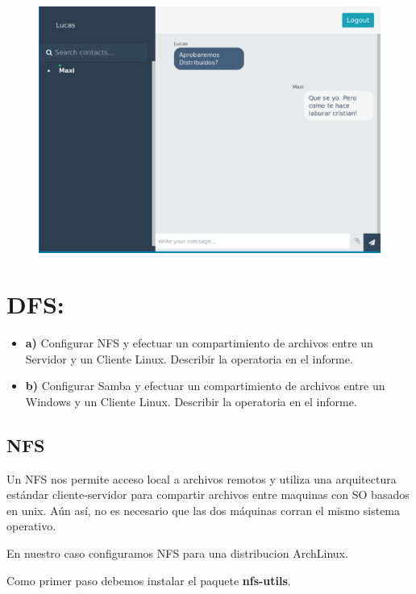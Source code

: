 \documentclass[12pt]{extarticle}
\begin{document}
\begin{figure}[h]
\centering
\includegraphics{images/chat-chat.png}
\end{figure}


    \section{DFS:}\label{dfs}

\begin{itemize}
\item
  \textbf{a)} Configurar NFS y efectuar un compartimiento de archivos
  entre un Servidor y un Cliente Linux. Describir la operatoria en el
  informe.
\item
  \textbf{b)} Configurar Samba y efectuar un compartimiento de archivos
  entre un Windows y un Cliente Linux. Describir la operatoria en el
  informe.
\end{itemize}

    \subsection{NFS}\label{nfs}

Un NFS nos permite acceso local a archivos remotos y utiliza una
arquitectura estándar cliente-servidor para compartir archivos entre
maquinas con SO basados en unix. Aún así, no es necesario que las dos
máquinas corran el mismo sistema operativo.

En nuestro caso configuramos NFS para una distribucion ArchLinux.

Como primer paso debemos instalar el paquete \textbf{nfs-utils}.
\end{document}
